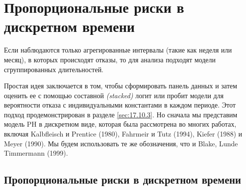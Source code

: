 \section{Пропорциональные риски в дискретном времени}\label{sec:17.10}

\noindent
Если наблюдаются только агрегированные интервалы (такие как неделя или месяц), в которых происходят отказы, то для анализа подходят модели сгруппированных длительностей.

Простая идея заключается в том, чтобы сформировать панель данных и затем оценить ее с помощью составной \textit{(stacked)} логит или пробит модели для вероятности отказа с индивидуальными константами в каждом периоде. Этот подход продемонстрирован в разделе \ref{sec:17.10.3}. Но сначала мы представим модель PH в дискретном виде, которая была рассмотрена во многих работах, включая Kalbfleisch и Prentice (1980), Fahrmeir и Tutz (1994), Kiefer (1988) и Meyer (1990). Мы будем использовать те же обозначения, что и Blake, Lunde Timmermann (1999).


\subsection{Пропорциональные риски в дискретном времени}\label{sec:17.10.1}

